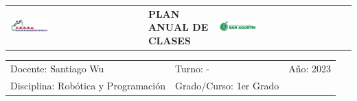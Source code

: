 \documentclass[landscape, a4paper, 10pt]{article}
\newcommand{\profesor}{Santiago Wu}
\newcommand{\discipline}{Robótica y Programación}
\newcommand{\currentyear}{2023}
\begin{document}
	\begin{tabularx}{\textwidth}{ >{\raggedright\arraybackslash}X >{\raggedright\arraybackslash}X >{\raggedright\arraybackslash}X }
		\includegraphics[width=0.3\textwidth]{cegsa-logo.png} &
		\textbf{PLAN ANUAL DE CLASES} &
		\includegraphics[width=0.3\textwidth]{cetsa-logo.png}
	\end{tabularx}
	\begin{tabularx}{\textwidth}{ >{\raggedright\arraybackslash}X >{\raggedright\arraybackslash}X >{\raggedright\arraybackslash}X }
		Docente: \profesor &
		Turno: - &
		Año: \currentyear \\
		Disciplina: \discipline &
		Grado/Curso: 1er Grado &
		 \\
	\end{tabularx}
	\centering
\end{document}
